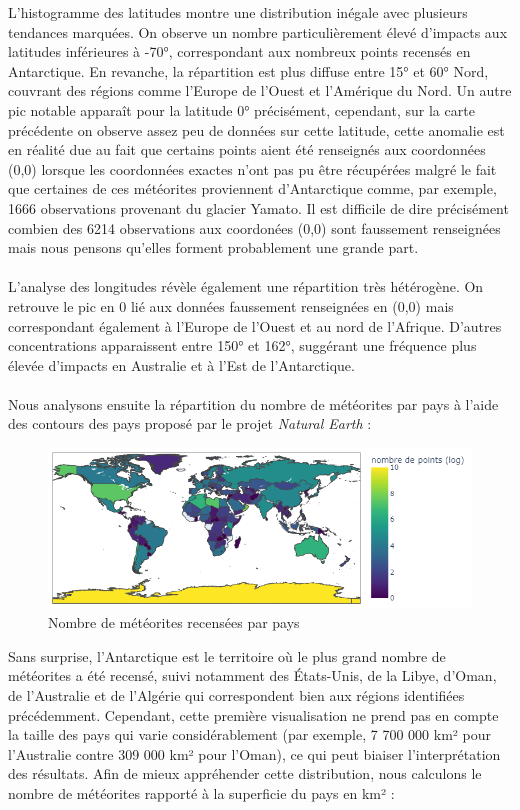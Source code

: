 \documentclass[12pt]{article}
\begin{document}
L'histogramme des latitudes montre une distribution inégale avec plusieurs tendances marquées. On observe un nombre particulièrement élevé d'impacts aux latitudes inférieures à -70°, correspondant aux nombreux points recensés en Antarctique. En revanche, la répartition est plus diffuse entre 15° et 60° Nord, couvrant des régions comme l'Europe de l'Ouest et l'Amérique du Nord. Un autre pic notable apparaît pour la latitude 0° précisément, cependant, sur la carte précédente on observe assez peu de données sur cette latitude, cette anomalie est en réalité due au fait que certains points aient été renseignés aux coordonnées (0,0) lorsque les coordonnées exactes n'ont pas pu être récupérées malgré le fait que certaines de ces météorites proviennent d'Antarctique comme, par exemple, 1666 observations provenant du glacier Yamato.  Il est difficile de dire précisément combien des 6214  observations aux coordonées (0,0) sont faussement renseignées mais nous pensons qu'elles forment probablement une grande part.\\
\\
L'analyse des longitudes révèle également une répartition très hétérogène. On retrouve le pic en 0 lié aux données faussement renseignées en (0,0) mais correspondant également  à l'Europe de l'Ouest et au nord de l'Afrique. D'autres concentrations apparaissent entre 150° et 162°, suggérant une fréquence plus élevée d'impacts en Australie et à l'Est de l'Antarctique.\\
\\
Nous analysons ensuite la répartition du nombre de météorites par pays à l'aide des contours des pays proposé par le projet \textit{Natural Earth} \cite{Natural_Earth} :
\begin{figure}[H]
 \centering 
\includegraphics[width=17cm]{Images/exploration/map_points_countries_avec_echelle.png}
 \caption{Nombre de météorites recensées par pays}
 \end{figure}
Sans surprise, l’Antarctique est le territoire où le plus grand nombre de météorites a été recensé, suivi notamment des États-Unis, de la Libye, d’Oman, de l’Australie et de l’Algérie qui correspondent bien aux régions identifiées précédemment. Cependant, cette première visualisation ne prend pas en compte la taille des pays qui varie considérablement (par exemple, 7 700 000 km² pour l’Australie contre 309 000 km² pour l'Oman), ce qui peut biaiser l’interprétation des résultats. Afin de mieux appréhender cette distribution, nous calculons le nombre de météorites rapporté à la superficie du pays en km² :
\end{document}
